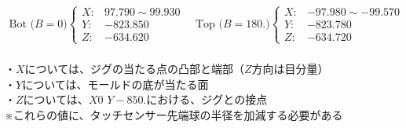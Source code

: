 \vfill
\begin{tcolorbox}[title={2023/07/28時点の\MMname 実測値}, fonttitle=\gtfamily\bfseries]
\begin{align*}
  \text{Bot ($B=0$)}
  \left\{
  \begin{array}{rl}
    X: & 97.790 \sim 99.930\\
    Y: & -823.850\\
    Z: & -634.620
  \end{array}
  \right.\quad
  \text{Top ($B=180.$)}
  \left\{
  \begin{array}{rl}
    X: & -97.980 \sim -99.570\\
    Y: & -823.780\\
    Z: & -634.720
  \end{array}
  \right.
\end{align*}\\
・$X$については、ジグの当たる点の凸部と端部（$Z$方向は目分量）\\
・$Y$については、モールドの底が当たる面\\
・$Z$については、$X0$ $Y-850.$における、ジグとの接点\\
※これらの値に、タッチセンサー先端球の半径を加減する必要がある
\end{tcolorbox}
